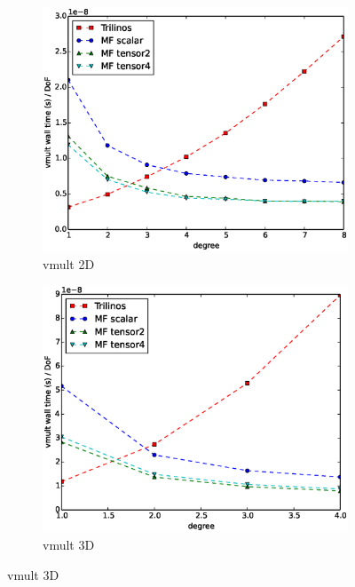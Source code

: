 \documentclass[preprint,12pt,times]{elsarticle}
\begin{document}
\begin{figure}[!ht]
  \centering
  \begin{subfigure}[b]{0.45\textwidth}
      \centering
      \includegraphics[width=\textwidth]{Emmy_RRZE_timing2d.eps}
      \caption{vmult 2D}
      \label{fig:benchmark_miehe_Emmy_vmult2}
  \end{subfigure}
  \begin{subfigure}[b]{0.45\textwidth}
    \centering
    \includegraphics[width=\textwidth]{Emmy_RRZE_timing3d.eps}
    \caption{vmult 3D}
    \label{fig:benchmark_miehe_Emmy_vmult3}
  \end{subfigure}

\end{figure}
\end{document}
